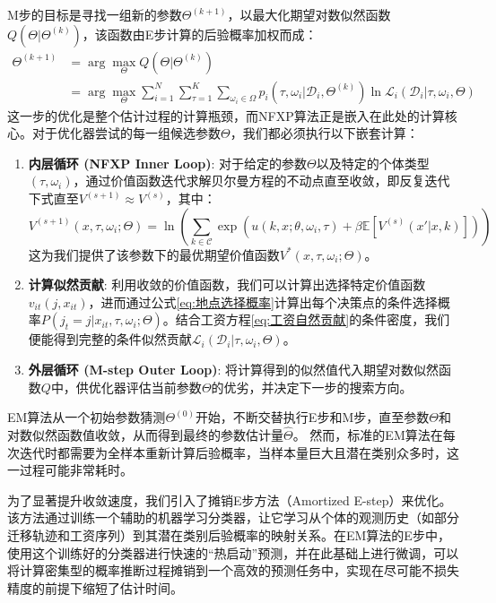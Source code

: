 \documentclass[master, final]{zufe-thesis}
\begin{document}
M步的目标是寻找一组新的参数$\Theta^{(k+1)}$，以最大化期望对数似然函数$Q(\Theta | \Theta^{(k)})$，该函数由E步计算的后验概率加权而成：
\begin{equation}
\begin{split}
    \Theta^{(k+1)} & = \arg\max_{\Theta} Q(\Theta | \Theta^{(k)}) 
    \\ & = \arg\max_{\Theta} \sum_{i=1}^{N} \sum_{\tau=1}^K \sum_{\omega_i \in \Omega} p_{i}(\tau, \omega_i | \mathcal{D}_i, \Theta^{(k)}) \ln \mathcal{L}_i(\mathcal{D}_i | \tau, \omega_i, \Theta)
\end{split}
\end{equation}
这一步的优化是整个估计过程的计算瓶颈，而NFXP算法正是嵌入在此处的计算核心。对于优化器尝试的每一组候选参数$\Theta$，我们都必须执行以下嵌套计算：
\begin{enumerate}
    \item \textbf{内层循环 (NFXP Inner Loop)}: 对于给定的参数$\Theta$以及特定的个体类型$(\tau, \omega_i)$，通过价值函数迭代求解贝尔曼方程的不动点直至收敛，即反复迭代下式直至$V^{(s+1)} \approx V^{(s)}$，其中：
    \begin{equation}
        V^{(s+1)}(x, \tau, \omega_i; \Theta) = \ln \left( \sum_{k \in \mathcal{C}} \exp \left( u(k, x; \theta, \omega_i, \tau) + \beta \mathbb{E}[V^{(s)}(x'|x,k)] \right) \right)
    \end{equation}
    这为我们提供了该参数下的最优期望价值函数$V^*(x, \tau, \omega_i; \Theta)$。

    \item \textbf{计算似然贡献}: 利用收敛的价值函数，我们可以计算出选择特定价值函数$v_{it}(j, x_{it})$，进而通过公式\eqref{eq:地点选择概率}计算出每个决策点的条件选择概率$P(j_t=j | x_{it}, \tau, \omega_i; \Theta)$。结合工资方程\eqref{eq:工资自然贡献}的条件密度，我们便能得到完整的条件似然贡献$\mathcal{L}_i(\mathcal{D}_i | \tau, \omega_i, \Theta)$。

    \item \textbf{外层循环 (M-step Outer Loop)}: 将计算得到的似然值代入期望对数似然函数$Q$中，供优化器评估当前参数$\Theta$的优劣，并决定下一步的搜索方向。
\end{enumerate}

EM算法从一个初始参数猜测$\Theta^{(0)}$开始，不断交替执行E步和M步，直至参数$\Theta$和对数似然函数值收敛，从而得到最终的参数估计量$\hat{\Theta}$。
然而，标准的EM算法在每次迭代时都需要为全样本重新计算后验概率，当样本量巨大且潜在类别众多时，这一过程可能非常耗时。

为了显著提升收敛速度，我们引入了摊销E步方法（Amortized E-step）来优化。该方法通过训练一个辅助的机器学习分类器，让它学习从个体的观测历史（如部分迁移轨迹和工资序列）到其潜在类别后验概率的映射关系。在EM算法的E步中，使用这个训练好的分类器进行快速的“热启动”预测，并在此基础上进行微调，可以将计算密集型的概率推断过程摊销到一个高效的预测任务中，实现在尽可能不损失精度的前提下缩短了估计时间。
\end{document}
